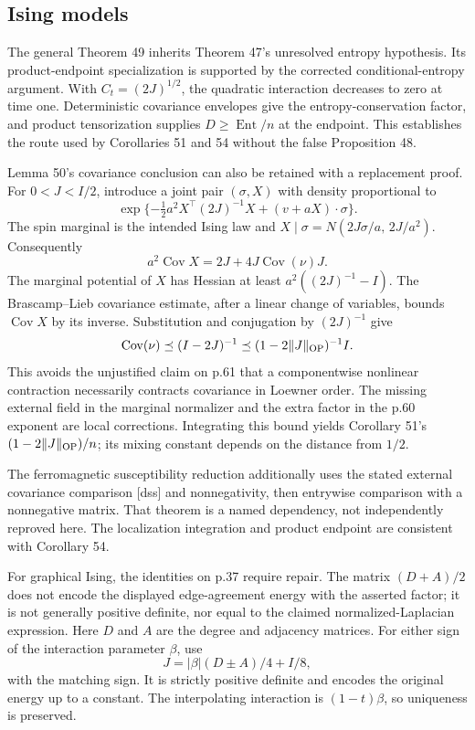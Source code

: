\documentclass[10pt]{article}
\begin{document}
\subsection*{Ising models}
The general Theorem 49 inherits Theorem 47’s unresolved entropy hypothesis. Its product-endpoint specialization is supported by the corrected conditional-entropy argument. With \(C_t=(2J)^{1/2}\), the quadratic interaction decreases to zero at time one. Deterministic covariance envelopes give the entropy-conservation factor, and product tensorization supplies \(D\ge\operatorname{Ent}/n\) at the endpoint. This establishes the route used by Corollaries 51 and 54 without the false Proposition 48.\par
Lemma 50’s covariance conclusion can also be retained with a replacement proof. For \(0<J<I/2\), introduce a joint pair \((\sigma,X)\) with density proportional to \[\exp\{-\tfrac12 a^2X^{\top}(2J)^{-1}X
                  +(v+aX)\cdot\sigma\}.\] The spin marginal is the intended Ising law and \(X\mid\sigma=N(2J\sigma/a,\,2J/a^2)\). Consequently \[a^2\operatorname{Cov}X=2J+4J\operatorname{Cov}(\nu)J.\] The marginal potential of \(X\) has Hessian at least \(a^2((2J)^{-1}-I)\). The Brascamp–Lieb covariance estimate, after a linear change of variables, bounds \(\operatorname{Cov}X\) by its inverse. Substitution and conjugation by \((2J)^{-1}\) give \[\operatorname{Cov}(\nu)\preceq(I-2J)^{-1}
       \preceq(1-2\|J\|_{\rm OP})^{-1}I.\] This avoids the unjustified claim on p.61 that a componentwise nonlinear contraction necessarily contracts covariance in Loewner order. The missing external field in the marginal normalizer and the extra factor in the p.60 exponent are local corrections. Integrating this bound yields Corollary 51’s \((1-2\|J\|_{\rm OP})/n\); its mixing constant depends on the distance from \(1/2\).\par
The ferromagnetic susceptibility reduction additionally uses the stated external covariance comparison [dss] and nonnegativity, then entrywise comparison with a nonnegative matrix. That theorem is a named dependency, not independently reproved here. The localization integration and product endpoint are consistent with Corollary 54.\par
For graphical Ising, the identities on p.37 require repair. The matrix \((D+A)/2\) does not encode the displayed edge-agreement energy with the asserted factor; it is not generally positive definite, nor equal to the claimed normalized-Laplacian expression. Here \(D\) and \(A\) are the degree and adjacency matrices. For either sign of the interaction parameter \(\beta\), use \[J=|\beta|(D\mathbin{\pm}A)/4+I/8,\] with the matching sign. It is strictly positive definite and encodes the original energy up to a constant. The interpolating interaction is \((1-t)\beta\), so uniqueness is preserved.\par
\end{document}
